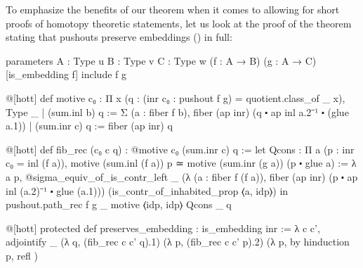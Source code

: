 To emphasize the benefits of our theorem when it comes to allowing for short
proofs of homotopy theoretic statements,
let us look at the proof of the theorem stating that pushouts preserve embeddings
() in full:
\begin{leancodebr}
parameters {A : Type u} {B : Type v} {C : Type w} (f : A → B) (g : A → C)
  [is_embedding f]
include f g

@[hott] def motive {c₀} :
  Π x (q : (inr c₀ : pushout f g) = quotient.class_of _ x), Type _
| (sum.inl b) q := Σ (a : fiber f b),
                     fiber (ap inr) (q ⬝ ap inl a.2⁻¹ ⬝ (glue a.1))
| (sum.inr c) q := fiber (ap inr) q

@[hott] def fib_rec (c₀ c q) : @motive c₀ (sum.inr c) q :=
let Qcons : Π a (p : inr c₀ = inl (f a)), 
            motive (sum.inl (f a)) p ≃ motive (sum.inr (g a)) (p ⬝ glue a) :=
 λ a p, @sigma_equiv_of_is_contr_left _
    (λ (a : fiber f (f a)), fiber (ap inr) (p ⬝ ap inl (a.2)⁻¹ ⬝ glue (a.1))) 
    (is_contr_of_inhabited_prop ⟨a, idp⟩) in
pushout.path_rec f g _ motive ⟨idp, idp⟩ Qcons _ q

@[hott] protected def preserves_embedding : is_embedding inr :=
λ c c', adjointify _ (λ q, (fib_rec c c' q).1)
  (λ p, (fib_rec c c' p).2) (λ p, by { hinduction p, refl })

\end{leancodebr}






